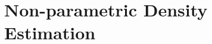 \chapter{Non-parametric Density Estimation}
\begin{refsection}
%
\printbibliography[heading=subbibliography]
\end{refsection}